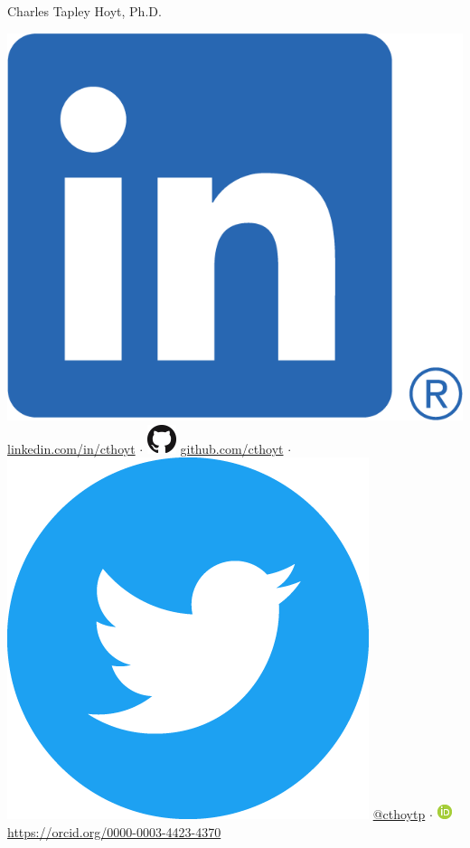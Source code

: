 \documentclass[11pt,a4paper,sans]{moderncv} %
\begin{document}
{\Huge Charles Tapley Hoyt, Ph.D.}

\vspace{3mm}

\includegraphics[scale=0.055]{LI-In-Bug.png}
\href{https://linkedin.com/in/cthoyt}{linkedin.com/in/cthoyt}
$\cdot$
\includegraphics[scale=0.25]{GitHub-Mark-32px.png}
\href{https://github.com/cthoyt}{github.com/cthoyt}
$\cdot$
\includegraphics[scale=0.02]{Twitter_Social_Icon_Circle_Color.png}
\href{https://twitter.com/cthoytp}{@cthoytp}
$\cdot$
\includegraphics[scale=0.5]{ORCIDiD_icon16x16.png}
\href{https://orcid.org/0000-0003-4423-4370}{https://orcid.org/0000-0003-4423-4370}
\end{document}
